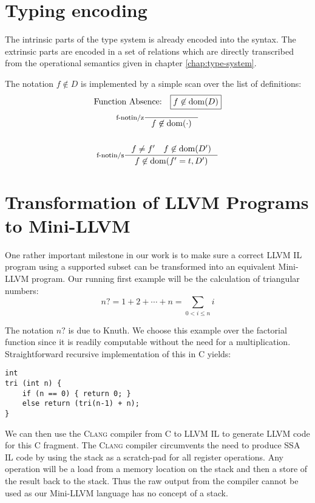 \documentclass[a4paper, oneside, 10pt, draft]{memoir}
\newcommand{\clang}{\textsc{Clang}}
\begin{document}
\section{Typing encoding}

The intrinsic parts of the type system is already encoded into the
syntax. The extrinsic parts are encoded in a set of relations which are
directly transcribed from the operational semantics given in chapter
\ref{chap:type-system}.

The notation $f \not \in D$ is implemented by a simple scan over the
list of definitions:
\begin{gather*}
  \text{Function Absence:} \quad \boxed{f \not \in \dom{D}}\\
  \inference[f-notin/z]{}{f \not \in \dom{\cdot}}\\\\
  \inference[f-notin/s]{f \neq f' \quad f \not \in \dom{D'}}{f \not \in \dom{f' = t, D'}}
\end{gather*}
\section{Transformation of LLVM Programs to Mini-LLVM}

One rather important milestone in our work is to make sure a correct
LLVM IL program using a supported subset can be transformed into an
equivalent Mini-LLVM program. Our running first example will be the
calculation of triangular numbers:
\begin{equation}
  \label{eq:1}
  n? = 1 + 2 + \dotsb + n = \sum_{0 < i \leq n} i
\end{equation}

The notation $n?$ is due to Knuth\cite[section
1.2.5]{knuth:1997:taocp1}. We choose this example over the factorial
function since it is readily computable without the need for a
multiplication. Straightforward recursive implementation of
this in C yields:
\begin{verbatim}
int
tri (int n) {
    if (n == 0) { return 0; }
    else return (tri(n-1) + n);
}
\end{verbatim}
We can then use the \clang{} compiler from C to LLVM IL to generate
LLVM code for this C fragment. The \clang{} compiler circumvents the
need to produce SSA IL code by using the stack as a scratch-pad for
all register operations. Any operation will be a load from a memory
location on the stack and then a store of the result back to the
stack. Thus the raw output from the compiler cannot be used as our
Mini-LLVM language has no concept of a stack.
\end{document}
